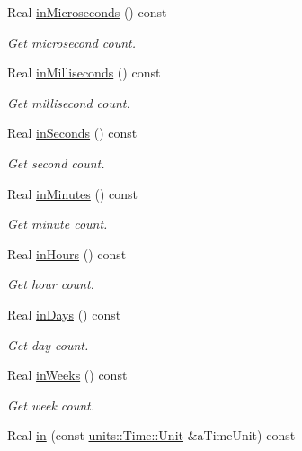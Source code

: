 \begin{DoxyCompactItemize}
Real \hyperlink{classostk_1_1physics_1_1time_1_1_duration_a67a7723ff079f5a4404a5fa1b0fd2128}{in\+Microseconds} () const
\begin{DoxyCompactList}\small\item\em Get microsecond count. \end{DoxyCompactList}\item 
Real \hyperlink{classostk_1_1physics_1_1time_1_1_duration_a8a754e57d49d857d7fbcd62be81b858d}{in\+Milliseconds} () const
\begin{DoxyCompactList}\small\item\em Get millisecond count. \end{DoxyCompactList}\item 
Real \hyperlink{classostk_1_1physics_1_1time_1_1_duration_ab2062045cd441c3eba4d58773a7bb01b}{in\+Seconds} () const
\begin{DoxyCompactList}\small\item\em Get second count. \end{DoxyCompactList}\item 
Real \hyperlink{classostk_1_1physics_1_1time_1_1_duration_a8ad5153d6f3ee225d9e4c32a2e19febc}{in\+Minutes} () const
\begin{DoxyCompactList}\small\item\em Get minute count. \end{DoxyCompactList}\item 
Real \hyperlink{classostk_1_1physics_1_1time_1_1_duration_a24026d219798a960db5482f4cda808c3}{in\+Hours} () const
\begin{DoxyCompactList}\small\item\em Get hour count. \end{DoxyCompactList}\item 
Real \hyperlink{classostk_1_1physics_1_1time_1_1_duration_a2c8f2e97717d02ba4f8dc044fe4f0b1e}{in\+Days} () const
\begin{DoxyCompactList}\small\item\em Get day count. \end{DoxyCompactList}\item 
Real \hyperlink{classostk_1_1physics_1_1time_1_1_duration_a99c5afa0b16e2239cd2cae12454d228d}{in\+Weeks} () const
\begin{DoxyCompactList}\small\item\em Get week count. \end{DoxyCompactList}\item 
Real \hyperlink{classostk_1_1physics_1_1time_1_1_duration_a03f34bc3528d1e33efdc9da44df157f4}{in} (const \hyperlink{classostk_1_1physics_1_1units_1_1_time_aa961f0dbca7ec297e19e15e0dfa3bb4a}{units\+::\+Time\+::\+Unit} \&a\+Time\+Unit) const

\end{DoxyCompactItemize}
